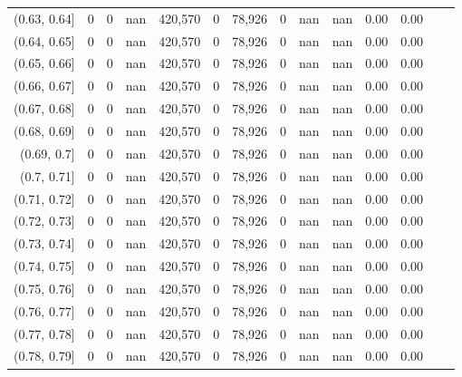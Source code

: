 \begin{tabular}{rrrrrrrrrrrrrr}
(0.63, 0.64]   &       0 &       0 &    nan &  420,570 &        0 &  78,926 &       0 &   nan &   nan &  0.00 &      0.00 \\
(0.64, 0.65]   &       0 &       0 &    nan &  420,570 &        0 &  78,926 &       0 &   nan &   nan &  0.00 &      0.00 \\
(0.65, 0.66]   &       0 &       0 &    nan &  420,570 &        0 &  78,926 &       0 &   nan &   nan &  0.00 &      0.00 \\
(0.66, 0.67]   &       0 &       0 &    nan &  420,570 &        0 &  78,926 &       0 &   nan &   nan &  0.00 &      0.00 \\
(0.67, 0.68]   &       0 &       0 &    nan &  420,570 &        0 &  78,926 &       0 &   nan &   nan &  0.00 &      0.00 \\
(0.68, 0.69]   &       0 &       0 &    nan &  420,570 &        0 &  78,926 &       0 &   nan &   nan &  0.00 &      0.00 \\
(0.69, 0.7]    &       0 &       0 &    nan &  420,570 &        0 &  78,926 &       0 &   nan &   nan &  0.00 &      0.00 \\
(0.7, 0.71]    &       0 &       0 &    nan &  420,570 &        0 &  78,926 &       0 &   nan &   nan &  0.00 &      0.00 \\
(0.71, 0.72]   &       0 &       0 &    nan &  420,570 &        0 &  78,926 &       0 &   nan &   nan &  0.00 &      0.00 \\
(0.72, 0.73]   &       0 &       0 &    nan &  420,570 &        0 &  78,926 &       0 &   nan &   nan &  0.00 &      0.00 \\
(0.73, 0.74]   &       0 &       0 &    nan &  420,570 &        0 &  78,926 &       0 &   nan &   nan &  0.00 &      0.00 \\
(0.74, 0.75]   &       0 &       0 &    nan &  420,570 &        0 &  78,926 &       0 &   nan &   nan &  0.00 &      0.00 \\
(0.75, 0.76]   &       0 &       0 &    nan &  420,570 &        0 &  78,926 &       0 &   nan &   nan &  0.00 &      0.00 \\
(0.76, 0.77]   &       0 &       0 &    nan &  420,570 &        0 &  78,926 &       0 &   nan &   nan &  0.00 &      0.00 \\
(0.77, 0.78]   &       0 &       0 &    nan &  420,570 &        0 &  78,926 &       0 &   nan &   nan &  0.00 &      0.00 \\
(0.78, 0.79]   &       0 &       0 &    nan &  420,570 &        0 &  78,926 &       0 &   nan &   nan &  0.00 &      0.00 \\

\end{tabular}
